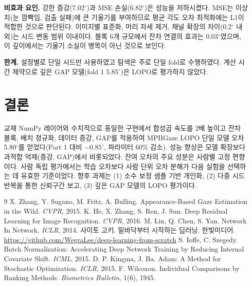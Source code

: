 \documentclass[10pt,twocolumn,a4paper]{article}
\newcommand{\dg}{^\circ}
\begin{document}
\textbf{비효과 요인.} 강한 증강(7.02$\dg$)과 MSE 손실(6.82$\dg$)은 성능을 저하시켰다. MSE는 이상치(눈 깜빡임, 검출 실패)에 큰 기울기를 부여하므로 평균 각도 오차 최적화에는 L1이 적합한 것으로 판단된다. 이미지별 표준화, 머리 자세 제거, 채널 확장의 차이(0.2$\dg$ 내외)는 시드 변동 범위 이내이다. 블록 6개 규모에서 잔차 연결의 효과는 0.03$\dg$였으며, 이 깊이에서는 기울기 소실이 병목이 아닌 것으로 보인다.

\textbf{한계.} 설정별로 단일 시드만 사용하였고 탐색은 주로 단일 fold로 수행하였다. 계산 시간 제약으로 깊은 GAP 모델(fold 1 5.85$\dg$)은 LOPO로 평가하지 않았다.

\section{결론}
교재 NumPy 레이어와 수치적으로 동일한 구현에서 합성곱 속도를 2배 높이고 잔차 블록, 배치 정규화, 데이터 증강, GAP를 적용하여 MPIIGaze LOPO 단일 모델 오차 5.80$\dg$를 얻었다(Part 1 대비 $-0.85\dg$, 파라미터 60\% 감소). 성능 향상은 모델 확장보다 과적합 억제(증강, GAP)에서 비롯되었다. 잔여 오차의 주요 성분은 사람별 고정 편향이다. 사람 독립 평가에서는 학습 오차보다 사람 단위 오차 분해가 다음 실험을 선택하는 데 유효한 기준이었다. 향후 과제는 (1) 소수 보정 샘플 기반 개인화, (2) 다중 시드 반복을 통한 신뢰구간 보고, (3) 깊은 GAP 모델의 LOPO 평가이다.

\small
\begin{thebibliography}{9}\setlength{\itemsep}{1pt}
 X. Zhang, Y. Sugano, M. Fritz, A. Bulling. Appearance-Based Gaze Estimation in the Wild. \textit{CVPR}, 2015.
 K. He, X. Zhang, S. Ren, J. Sun. Deep Residual Learning for Image Recognition. \textit{CVPR}, 2016.
 M. Lin, Q. Chen, S. Yan. Network In Network. \textit{ICLR}, 2014.
 사이토 고키. 밑바닥부터 시작하는 딥러닝. 한빛미디어. \url{https://github.com/WegraLee/deep-learning-from-scratch}
 S. Ioffe, C. Szegedy. Batch Normalization: Accelerating Deep Network Training by Reducing Internal Covariate Shift. \textit{ICML}, 2015.
 D. P. Kingma, J. Ba. Adam: A Method for Stochastic Optimization. \textit{ICLR}, 2015.
 F. Wilcoxon. Individual Comparisons by Ranking Methods. \textit{Biometrics Bulletin}, 1(6), 1945.
\end{thebibliography}
\end{document}
